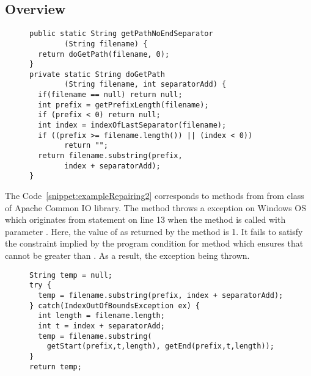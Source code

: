 \subsection{Overview}
\label{subsec:overview}

\begin{figure}[t]
\centering
\begin{lstlisting}
public static String getPathNoEndSeparator
        (String filename) {
  return doGetPath(filename, 0);
}
private static String doGetPath
        (String filename, int separatorAdd) {
  if(filename == null) return null;
  int prefix = getPrefixLength(filename);
  if (prefix < 0) return null;
  int index = indexOfLastSeparator(filename);
  if ((prefix >= filename.length()) || (index < 0))
        return "";
  return filename.substring(prefix,
        index + separatorAdd);
}
\end{lstlisting}
\end{figure}

The Code~\ref{snippet:exampleRepairing2} corresponds to methods from
from  class of Apache Common IO library. The method
 throws
a  exception on Windows OS which originates from
statement  on
line 13 when the method is called with parameter .  Here, the
value of  as returned by the method  is 1.
It fails to satisfy the constraint implied by the program condition
 for  method which 
ensures that  cannot be greater than . As a result,
the exception being thrown.


\begin{figure}[t]
\centering
\begin{lstlisting}
String temp = null;
try {
  temp = filename.substring(prefix, index + separatorAdd);
} catch(IndexOutOfBoundsException ex) {
  int length = filename.length;
  int t = index + separatorAdd;
  temp = filename.substring(
    getStart(prefix,t,length), getEnd(prefix,t,length));
}
return temp;
\end{lstlisting}
\end{figure}

